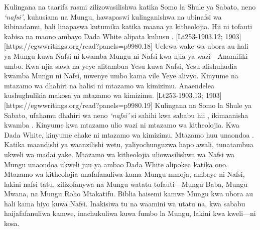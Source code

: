 Kulingana na taarifa rasmi zilizowasilishwa katika Somo la Shule ya Sabato, neno \textit{‘nafsi’},\textit{ }kuhusiana na Mungu, hawapaswi kulinganishwa na ubinafsi wa kibinadamu, bali linapaswa kutumika katika maana ya kitheolojia. Hii ni tofauti kabisa na maono ambayo Dada White alipata kuhusu . [Lt253-1903.12; 1903][https://egwwritings.org/read?panels=p9980.18] Uelewa wake wa ubora au hali ya Mungu kuwa Nafsi ni kwamba Mungu ni Nafsi kwa njia ya wazi—Anamiliki umbo. Kwa njia sawa na yeye alitambua Yesu kuwa Nafsi, Yesu alishuhudia kwamba Mungu ni Nafsi, mwenye umbo kama vile Yeye alivyo. Kinyume na mtazamo wa dhahiri na halisi ni mtazamo wa kimizimu. Anaendelea kushughulikia makosa ya mtazamo wa kimizimu. [Lt253-1903.13; 1903][https://egwwritings.org/read?panels=p9980.19] Kulingana na Somo la Shule ya Sabato, ufahamu dhahiri wa neno \textit{‘nafsi’ }si sahihi kwa sababu hii , ikimaanisha kwamba . Kinyume kwa mtazamo ulio wazi ni mtazamo wa kitheolojia. Kwa Dada White, kinyume chake ni mtazamo wa kimizimu. Mtazamo huu unaondoa . Katika maandishi ya waanzilishi wetu, yaliyochunguzwa hapo awali, tunatambua ukweli wa madai yake. Mtazamo wa kitheolojia uliowasilishwa wa Nafsi wa Mungu unaondoa ukweli juu ya  ambao Dada White alipokea katika ono. Mtazamo wa kitheolojia unafafanuliwa kama Mungu mmoja, ambaye ni Nafsi, lakini nafsi tatu, zilizofanywa na Mungu watatu tofauti—Mungu Baba, Mungu Mwana, na Mungu Roho Mtakatifu. Biblia haisemi kamwe Mungu kwa ubora au hali kama hiyo kuwa Nafsi. Inakisiwa tu na waamini wa utatu na, kwa sababu haijafafanuliwa kamwe, inachukuliwa kuwa fumbo la Mungu, lakini kwa kweli—ni kosa.

